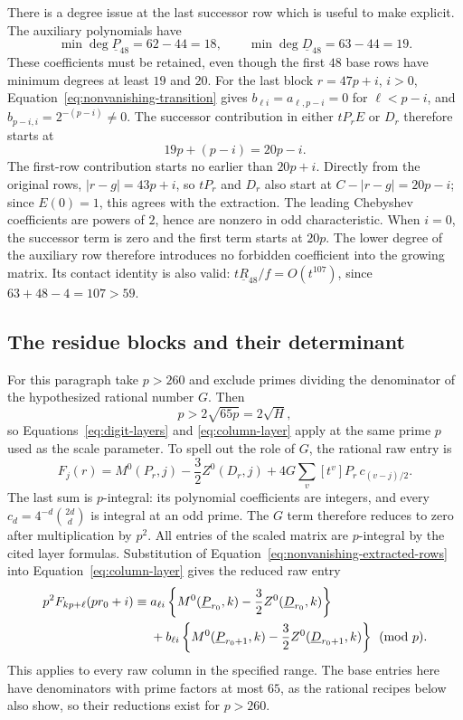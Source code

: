 There is a degree issue at the last successor row which is useful to make
explicit. The auxiliary polynomials have
\begin{equation}\label{eq:nonvanishing-auxiliary-degrees}
 \min\deg\underline P_{48}=62-44=18,\qquad
 \min\deg\underline D_{48}=63-44=19.
\end{equation}
These coefficients must be retained, even though the first $48$ base rows
have minimum degrees at least $19$ and $20$. For the last block
$r=47p+i$, $i>0$, Equation~\eqref{eq:nonvanishing-transition} gives
$b_{\ell i}=a_{\ell,p-i}=0$ for $\ell<p-i$, and
$b_{p-i,i}=2^{-(p-i)}\ne0$. The successor contribution in either
$tP_rE$ or $D_r$ therefore starts at
\[
 19p+(p-i)=20p-i.
\]
The first-row contribution starts no earlier than $20p+i$.
Directly from the original rows, $|r-g|=43p+i$, so $tP_r$ and $D_r$
also start at $C-|r-g|=20p-i$; since $E(0)=1$, this agrees with the
extraction. The leading Chebyshev coefficients are powers of $2$, hence
are nonzero in odd characteristic. When $i=0$, the successor term is
zero and the first term starts at $20p$. The lower degree of the
auxiliary row therefore introduces no forbidden coefficient into the
growing matrix. Its contact identity is also valid:
$t\underline R_{48}/f=O(t^{107})$, since $63+48-4=107>59$.

\subsection{The residue blocks and their determinant}

For this paragraph take $p>260$ and exclude primes dividing the denominator
of the hypothesized rational number $G$. Then
\[
 p>2\sqrt{65p}=2\sqrt H,
\]
so Equations~\eqref{eq:digit-layers} and \eqref{eq:column-layer} apply at
the same prime $p$ used as the scale parameter. To spell out the role of
$G$, the rational raw entry is
\[
 F_j(r)=M^0(P_r,j)-\frac32 Z^0(D_r,j)
          +4G\sum_v[t^v]P_r\,c_{(v-j)/2}.
\]
The last sum is $p$-integral: its polynomial coefficients are integers,
and every $c_d=4^{-d}\binom{2d}{d}$ is integral at an odd prime.
The $G$ term therefore reduces to zero after multiplication by $p^2$.
All entries of the scaled matrix are $p$-integral by the cited layer
formulas. Substitution of Equation~\eqref{eq:nonvanishing-extracted-rows}
into Equation~\eqref{eq:column-layer} gives the reduced raw entry
\begin{align}
 p^2F_{kp+\ell}(pr_0+i)
 \equiv{}&a_{\ell i}\left\{M^0(\underline P_{r_0},k)
                         -\frac32 Z^0(\underline D_{r_0},k)\right\}
                         \notag\\
 &+b_{\ell i}\left\{M^0(\underline P_{r_0+1},k)
                         -\frac32 Z^0(\underline D_{r_0+1},k)\right\}
                         \pmod p.
 \label{eq:nonvanishing-raw-bridge}
\end{align}
This applies to every raw column in the specified range. The base
entries here have denominators with prime factors at most $65$, as
the rational recipes below also show, so their reductions exist for
$p>260$.

